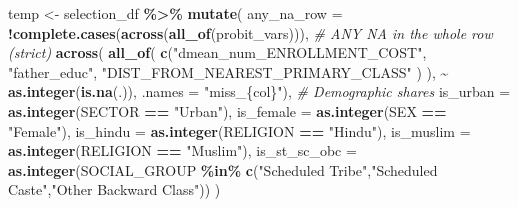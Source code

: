 \documentclass[
]{article}
\newenvironment{Shaded}{\begin{snugshade}}{\end{snugshade}}
\newcommand{\AttributeTok}[1]{\textcolor[rgb]{0.13,0.29,0.53}{#1}}
\newcommand{\CommentTok}[1]{\textcolor[rgb]{0.56,0.35,0.01}{\textit{#1}}}
\newcommand{\FunctionTok}[1]{\textcolor[rgb]{0.13,0.29,0.53}{\textbf{#1}}}
\newcommand{\NormalTok}[1]{#1}
\newcommand{\OtherTok}[1]{\textcolor[rgb]{0.56,0.35,0.01}{#1}}
\newcommand{\SpecialCharTok}[1]{\textcolor[rgb]{0.81,0.36,0.00}{\textbf{#1}}}
\newcommand{\StringTok}[1]{\textcolor[rgb]{0.31,0.60,0.02}{#1}}
\begin{document}
\begin{Shaded}
\begin{Highlighting}[]
\NormalTok{temp }\OtherTok{\textless{}{-}}\NormalTok{ selection\_df }\SpecialCharTok{\%\textgreater{}\%}
  \FunctionTok{mutate}\NormalTok{(}
    \AttributeTok{any\_na\_row =} \SpecialCharTok{!}\FunctionTok{complete.cases}\NormalTok{(}\FunctionTok{across}\NormalTok{(}\FunctionTok{all\_of}\NormalTok{(probit\_vars))),  }\CommentTok{\# ANY NA in the whole row (strict)}
    \FunctionTok{across}\NormalTok{(}
      \FunctionTok{all\_of}\NormalTok{(}
        \FunctionTok{c}\NormalTok{(}\StringTok{"dmean\_num\_ENROLLMENT\_COST"}\NormalTok{,}
          \StringTok{"father\_educ"}\NormalTok{,}
          \StringTok{"DIST\_FROM\_NEAREST\_PRIMARY\_CLASS"}
\NormalTok{          )}
\NormalTok{        ),}
      \SpecialCharTok{\textasciitilde{}} \FunctionTok{as.integer}\NormalTok{(}\FunctionTok{is.na}\NormalTok{(.)),}
      \AttributeTok{.names =} \StringTok{"miss\_\{col\}"}\NormalTok{),}
    \CommentTok{\# Demographic shares}
    \AttributeTok{is\_urban =} \FunctionTok{as.integer}\NormalTok{(SECTOR }\SpecialCharTok{==} \StringTok{"Urban"}\NormalTok{),}
    \AttributeTok{is\_female =} \FunctionTok{as.integer}\NormalTok{(SEX }\SpecialCharTok{==} \StringTok{"Female"}\NormalTok{),}
    \AttributeTok{is\_hindu =} \FunctionTok{as.integer}\NormalTok{(RELIGION }\SpecialCharTok{==} \StringTok{"Hindu"}\NormalTok{),}
    \AttributeTok{is\_muslim =} \FunctionTok{as.integer}\NormalTok{(RELIGION }\SpecialCharTok{==} \StringTok{"Muslim"}\NormalTok{),}
    \AttributeTok{is\_st\_sc\_obc =} \FunctionTok{as.integer}\NormalTok{(SOCIAL\_GROUP }\SpecialCharTok{\%in\%} \FunctionTok{c}\NormalTok{(}\StringTok{"Scheduled Tribe"}\NormalTok{,}\StringTok{"Scheduled Caste"}\NormalTok{,}\StringTok{"Other Backward Class"}\NormalTok{))}
\NormalTok{  )}


\end{Highlighting}
\end{Shaded}
\end{document}

